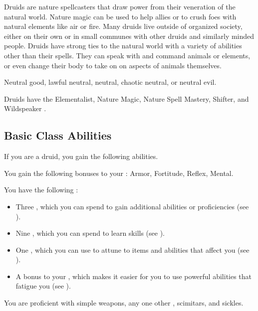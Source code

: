     Druids are nature spellcasters that draw power from their veneration of the natural world.
    Nature magic can be used to help allies or to crush foes with natural elements like air or fire.
    Many druids live outside of organized society, either on their own or in small communes with other druids and similarly minded people.
    Druids have strong ties to the natural world with a variety of abilities other than their spells.
    They can speak with and command animals or elements, or even change their body to take on on aspects of animals themselves.

     Neutral good, lawful neutral, neutral, chaotic neutral, or neutral evil.

     Druids have the Elementalist, Nature Magic, Nature Spell Mastery, Shifter, and Wildspeaker .

    \subsection{Basic Class Abilities}
        If you are a druid, you gain the following abilities.

        You gain the following bonuses to your :  Armor,  Fortitude,  Reflex,  Mental.

         You have the following :
        \begin{itemize}
            \item Three , which you can spend to gain additional abilities or proficiencies (see ).
            \item Nine , which you can spend to learn skills (see ).
            \item One , which you can use to attune to items and abilities that affect you (see ).
            \item A  bonus to your , which makes it easier for you to use powerful abilities that fatigue you (see ).
        \end{itemize}

        You are proficient with simple weapons, any one other , scimitars, and sickles.

